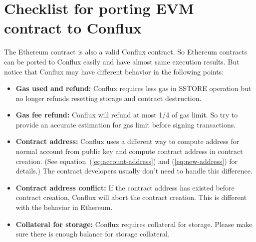\documentclass[fleqn,10pt]{SelfArx} %
\begin{document}


% 


{}







\newpage
\appendix

\section{Checklist for porting EVM contract to Conflux}

The Ethereum contract is also a valid Conflux contract. So Ethereum contracts can be ported to Conflux easily and have almost same execution results. But notice that Conflux may have different behavior in the following points:
\begin{itemize}
	\item {\bf Gas used and refund:} Conflux requires less gas in SSTORE operation but no longer refunds resetting storage and contract destruction. 
	\item {\bf Gas fee refund:} Conflux will refund at most 1/4 of gas limit. So try to provide an accurate estimation for gas limit before signing transactions. 
	\item {\bf Contract address:} Conflux uses a different way to compute address for normal account from public key and compute contract address in contract creation. (See equation~(\ref{eq:account-address}) and (\ref{eq:new-address}) for details.) The contract developers usually don't need to handle this difference. 
	\item {\bf Contract address conflict:} If the contract address has existed before contract creation, Conflux will abort the contract creation. This is different with the behavior in Ethereum. 
	\item {\bf Collateral for storage:} Conflux requires collateral for storage. Please make sure there is enough balance for storage collateral. 

\end{itemize}
\end{document}
